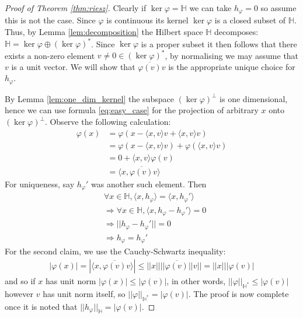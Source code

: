 \documentclass[12pt]{article}
\theoremstyle{plain}
\theoremstyle{definition}
\newcommand{\bb}[1]{\mathbb{#1}}
\begin{document}
\begin{proof}[Proof of Theorem \ref{thm:riesz}]
Clearly if $\operatorname{ker}\varphi = \bb{H}$ we can take $h_\varphi = 0$ so assume this is not the case. Since $\varphi$ is continuous its kernel $\operatorname{ker}\varphi$ is a closed subset of $\bb{H}$. Thus, by Lemma \ref{lem:decomposition} the Hilbert space $\bb{H}$ decomposes: $\bb{H} = \operatorname{ker}\varphi \oplus (\operatorname{ker}\varphi)^\ast$. Since $\operatorname{ker}\varphi$ is a proper subset it then follows that there exists a non-zero element $v\neq0 \in (\operatorname{ker}\varphi)^\ast$, by normalising we may assume that $v$ is a unit vector. We will show that $\overline{\varphi(v)}v$ is the appropriate unique choice for $h_\varphi$.

By Lemma \ref{lem:one_dim_kernel} the subspace $(\operatorname{ker}\varphi)^\perp$ is one dimensional, hence we can use formula \eqref{eq:easy_case} for the projection of arbitrary $x$ onto $(\operatorname{ker}\varphi)^\perp$. Observe the following calculation:
\begin{align*}
    \varphi(x) &= \varphi(x - \langle x,v\rangle v + \langle x,v\rangle v)\\
    &= \varphi(x - \langle x,v\rangle v) + \varphi(\langle x,v\rangle v)\\
    &= 0 + \langle x,v\rangle\varphi(v)\\
    &= \langle x, \overline{\varphi(v)}v\rangle
\end{align*}
For uniqueness, say $h_\varphi'$ was another such element. Then
\begin{align*}
    &\forall x \in \bb{H}, \langle x, h_\varphi\rangle = \langle x, h_\varphi'\rangle\\
    &\Longrightarrow \forall x \in \bb{H}, \langle x, h_\varphi - h_\varphi'\rangle = 0\\
    &\Longrightarrow|| h_\varphi - h_\varphi'|| = 0\\
    &\Longrightarrow h_\varphi = h_\varphi'
\end{align*}
For the second claim, we use the Cauchy-Schwartz inequality:
\begin{align*}
    |\varphi(x)| = |\langle x, \overline{\varphi(v)}v\rangle| \leq ||x||||\overline{\varphi(v)}||v|| = ||x|||\varphi(v)|
\end{align*}
and so if $x$ has unit norm $|\varphi(x)| \leq |\varphi(v)|$, in other words, $||\varphi||_{\bb{H}^\ast} \leq |\varphi(v)|$ however $v$ has unit norm itself, so $||\varphi||_{\bb{H}^\ast} = |\varphi(v)|$. The proof is now complete once it is noted that $||h_\varphi||_{\bb{H}} = |\varphi(v)|$.
\end{proof}
\end{document}
